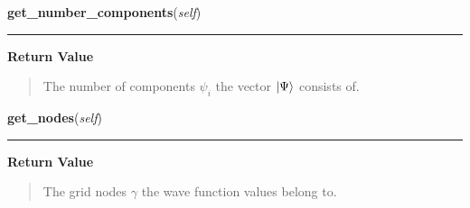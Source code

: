    \label{WaveFunction:WaveFunction:get_number_components}

    \vspace{0.5ex}

\hspace{.8\funcindent}\begin{boxedminipage}{\funcwidth}

    \raggedright \textbf{get\_number\_components}(\textit{self})

    \vspace{-1.5ex}

    \rule{\textwidth}{0.5\fboxrule}
\setlength{\parskip}{2ex}
\setlength{\parskip}{1ex}
      \textbf{Return Value}
    \vspace{-1ex}

      \begin{quote}
      The number of components $\psi_i$ the vector
      $\Ket{\Psi}$ consists of.

      \end{quote}

    \end{boxedminipage}

    \label{WaveFunction:WaveFunction:get_nodes}

    \vspace{0.5ex}

\hspace{.8\funcindent}\begin{boxedminipage}{\funcwidth}

    \raggedright \textbf{get\_nodes}(\textit{self})

    \vspace{-1.5ex}

    \rule{\textwidth}{0.5\fboxrule}
\setlength{\parskip}{2ex}
\setlength{\parskip}{1ex}
      \textbf{Return Value}
    \vspace{-1ex}

      \begin{quote}
      The grid nodes $\gamma$ the wave function values
      belong to.

      \end{quote}

    \end{boxedminipage}

    \label{WaveFunction:WaveFunction:get_values}

